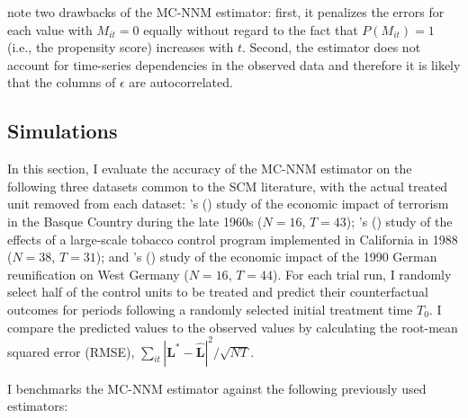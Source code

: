 \documentclass[12pt]{article}
\newcommand{\possessivecite}[1]{\citeauthor{#1}'s (\citeyear{#1})}
\begin{document}
\citet{athey2017matrix} note two drawbacks of the MC-NNM estimator: first, it penalizes the errors for each value with $M_{it} = 0$ equally without regard to the fact that $P(M_{it}) = 1$ (i.e., the propensity score) increases with $t$. Second, the estimator does not account for time-series dependencies in the observed data and therefore it is likely that the columns of $\epsilon$ are autocorrelated.

\subsection{Simulations} \label{sims}

In this section, I evaluate the accuracy of the MC-NNM estimator on the following three datasets common to the SCM literature, with the actual treated unit removed from each dataset: \possessivecite{abadie2003economic} study of the economic impact of terrorism in the Basque Country during the late 1960s ($N=16$, $T=43$); \possessivecite{abadie2010synthetic} study of the effects of a large-scale tobacco control program implemented in California in 1988 ($N=38$, $T=31$); and \possessivecite{abadie2015comparative} study of the economic impact of the 1990 German reunification on West Germany ($N=16$, $T=44$). For each trial run, I randomly select half of the control units to be treated and predict their counterfactual outcomes for periods following a randomly selected initial treatment time $T_0$. I compare the predicted values to the observed values by calculating the root-mean squared error (RMSE), $\sum_{it}|\mathbf{L^{*}} -\hat{\mathbf{L}}|^2 / \sqrt{NT}$. 

I benchmarks the MC-NNM estimator against the following previously used estimators:
\end{document}
